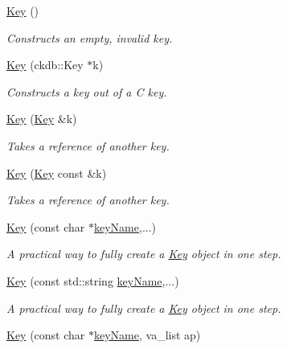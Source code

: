\begin{DoxyCompactItemize}
\item 
\mbox{\hyperlink{classkdb_1_1Key_a5679f5cae63caddd64a60388b9cc77fa}{Key}} ()
\begin{DoxyCompactList}\small\item\em Constructs an empty, invalid key. \end{DoxyCompactList}\item 
\mbox{\hyperlink{classkdb_1_1Key_a41ada34fa45a270e63444267621b59c9}{Key}} (ckdb\+::\+Key $\ast$k)
\begin{DoxyCompactList}\small\item\em Constructs a key out of a C key. \end{DoxyCompactList}\item 
\mbox{\hyperlink{classkdb_1_1Key_a33f63e153a7d832a54e02c0cba569feb}{Key}} (\mbox{\hyperlink{classkdb_1_1Key}{Key}} \&k)
\begin{DoxyCompactList}\small\item\em Takes a reference of another key. \end{DoxyCompactList}\item 
\mbox{\hyperlink{classkdb_1_1Key_ab68da8be743b2f635ff8e28dfaeaaea6}{Key}} (\mbox{\hyperlink{classkdb_1_1Key}{Key}} const \&k)
\begin{DoxyCompactList}\small\item\em Takes a reference of another key. \end{DoxyCompactList}\item 
\mbox{\hyperlink{classkdb_1_1Key_a15b2e9e1cc323cde05b0d1d3805656e0}{Key}} (const char $\ast$\mbox{\hyperlink{group__keyname_ga8e805c726a60da921d3736cda7813513}{key\+Name}},...)
\begin{DoxyCompactList}\small\item\em A practical way to fully create a \mbox{\hyperlink{classkdb_1_1Key}{Key}} object in one step. \end{DoxyCompactList}\item 
\mbox{\hyperlink{classkdb_1_1Key_acbf7642258d46da2c4427f4104cf01ee}{Key}} (const std\+::string \mbox{\hyperlink{group__keyname_ga8e805c726a60da921d3736cda7813513}{key\+Name}},...)
\begin{DoxyCompactList}\small\item\em A practical way to fully create a \mbox{\hyperlink{classkdb_1_1Key}{Key}} object in one step. \end{DoxyCompactList}\item 
\mbox{\hyperlink{classkdb_1_1Key_aa0dc94c7e676a0d280e5817e4c6238d3}{Key}} (const char $\ast$\mbox{\hyperlink{group__keyname_ga8e805c726a60da921d3736cda7813513}{key\+Name}}, va\+\_\+list ap)

\end{DoxyCompactItemize}
